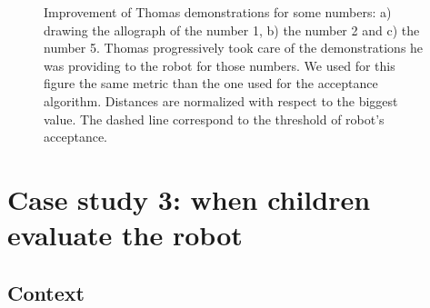 \documentclass{sig-alternate}
\begin{document}
\begin{figure}
    \centering
    \caption{\small Improvement of Thomas demonstrations for some numbers: a) drawing the allograph of the number 1, b) the number 2 and c) the number 5. Thomas progressively took care of the demonstrations he was providing to the robot for those numbers. We used for this figure the same metric than the one used for the acceptance algorithm. Distances are normalized with respect to the biggest value. The dashed line correspond to the threshold of robot's acceptance.}

    \label{Thomas_progress}
\end{figure}

\section{Case study 3: when children evaluate the robot}\label{auto}

\subsection{Context}
\end{document}
